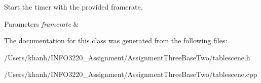 Start the timer with the provided framerate. 


\begin{DoxyParams}{Parameters}
{\em framerate} & \\
\hline
\end{DoxyParams}


The documentation for this class was generated from the following files\+:\begin{DoxyCompactItemize}
\item 
/\+Users/khanh/\+I\+N\+F\+O3220\+\_\+\+Assignment/\+Assignment\+Three\+Base\+Two/tablescene.\+h\item 
/\+Users/khanh/\+I\+N\+F\+O3220\+\_\+\+Assignment/\+Assignment\+Three\+Base\+Two/tablescene.\+cpp\end{DoxyCompactItemize}
